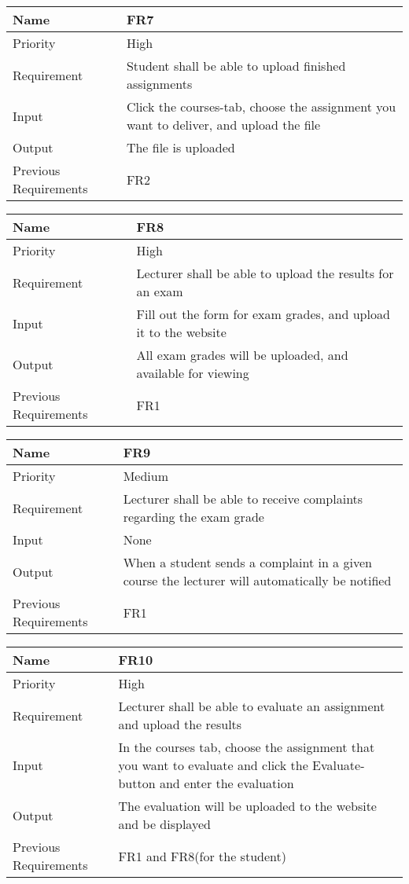 \begin{tabularx}{\textwidth}{|l|X|}
  \hline
  Name & FR7 \\ \hline
  Priority & High \\ \hline
  Requirement & Student shall be able to upload finished assignments \\ \hline
  Input & Click the courses-tab, choose the assignment you want to deliver, and upload the file \\ \hline
  Output & The file is uploaded \\ \hline
  Previous Requirements & FR2 \\ \hline
\end{tabularx}

\begin{tabularx}{\textwidth}{|l|X|}
  \hline
  Name & FR8 \\ \hline
  Priority & High \\ \hline
  Requirement & Lecturer shall be able to upload the results for an exam \\ \hline
  Input & Fill out the form for exam grades, and upload it to the website \\ \hline
  Output & All exam grades will be uploaded, and available for viewing \\ \hline
  Previous Requirements & FR1 \\ \hline
\end{tabularx}

\begin{tabularx}{\textwidth}{|l|X|}
  \hline
  Name & FR9 \\ \hline
  Priority & Medium \\ \hline
  Requirement & Lecturer shall be able to receive complaints regarding the exam grade \\ \hline
  Input & None \\ \hline
  Output & When a student sends a complaint in a given course the lecturer will automatically be notified \\ \hline
  Previous Requirements & FR1 \\ \hline
\end{tabularx}

\begin{tabularx}{\textwidth}{|l|X|}
  \hline
  Name & FR10 \\ \hline
  Priority & High \\ \hline
  Requirement & Lecturer shall be able to evaluate an assignment and upload the results \\ \hline
  Input & In the courses tab, choose the assignment that you want to evaluate and click the Evaluate-button and enter the evaluation \\ \hline
  Output & The evaluation will be uploaded to the website and be displayed \\ \hline
  Previous Requirements & FR1 and FR8(for the student) \\ \hline
\end{tabularx}

